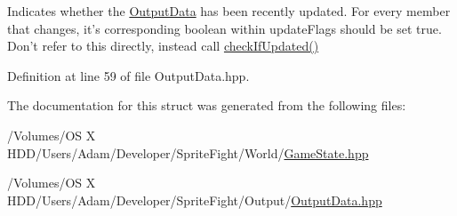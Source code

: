 Indicates whether the \hyperlink{struct_output_data}{Output\-Data} has been recently updated. For every member that changes, it's corresponding boolean within update\-Flags should be set true. Don't refer to this directly, instead call \hyperlink{struct_output_data_a2b19b9cd0df099c3f923f9c5f1ef28d9}{check\-If\-Updated()} 



Definition at line 59 of file Output\-Data.\-hpp.



The documentation for this struct was generated from the following files\-:\begin{DoxyCompactItemize}
\item 
/\-Volumes/\-O\-S X H\-D\-D/\-Users/\-Adam/\-Developer/\-Sprite\-Fight/\-World/\hyperlink{_game_state_8hpp}{Game\-State.\-hpp}\item 
/\-Volumes/\-O\-S X H\-D\-D/\-Users/\-Adam/\-Developer/\-Sprite\-Fight/\-Output/\hyperlink{_output_data_8hpp}{Output\-Data.\-hpp}\end{DoxyCompactItemize}
